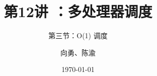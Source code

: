 


\title[第1讲]{第12讲 ：多处理器调度} %
\subtitle{第三节：O(1) 调度}
\author{向勇、陈渝} %
\date{\today} %




\begin{frame}
\titlepage %
\end{frame}

%
%

